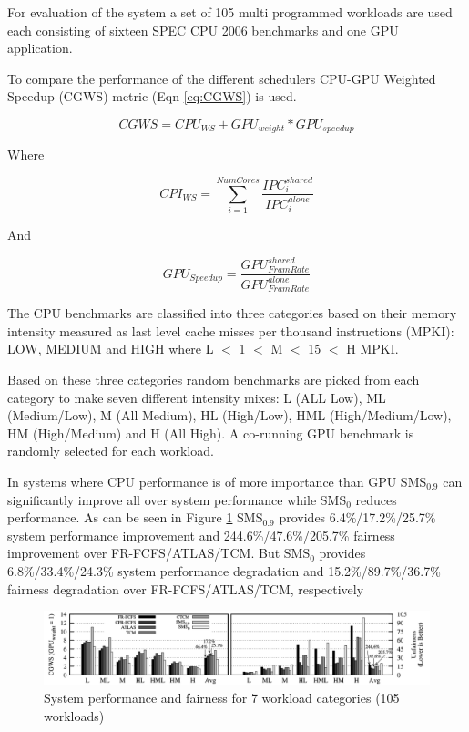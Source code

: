 \documentclass[12pt,journal,compsoc]{IEEEtran}
\begin{document}
For evaluation of the system a set of 105 multi programmed workloads are used each consisting of sixteen SPEC CPU 2006 benchmarks and one GPU application.  

To compare the performance of the different schedulers CPU-GPU Weighted Speedup (CGWS) metric (Eqn \ref{eq:CGWS})  is used.

\begin{equation}
CGWS = CPU_{WS} + GPU_{weight}*GPU_{speedup} \label{eq:CGWS}
\end{equation} 

Where
 
\begin{equation}
CPI_{WS} = \sum_{i=1}^{NumCores}\frac{IPC_i^{shared}}{IPC_i^{alone}}
\end{equation}

And 

\begin{equation}
GPU_{Speedup} = \frac{GPU_{FramRate}^{shared}}{GPU_{FramRate}^{alone}}
\end{equation}

The CPU benchmarks are classified into three categories based on their memory intensity measured as last level cache misses per thousand instructions (MPKI): LOW, MEDIUM and HIGH where L $<$ 1 $<$ M $<$ 15 $<$ H MPKI.

Based on these three categories random benchmarks are picked from each category to make seven different intensity mixes: L (ALL Low), ML (Medium/Low), M (All Medium), HL (High/Low),  HML (High/Medium/Low),  HM (High/Medium) and H (All High).  A co-running GPU benchmark is randomly selected for each workload.

In systems where CPU performance is of more importance than GPU SMS$_{0.9}$ can significantly improve all over system performance while SMS$_0$ reduces performance. As can be seen in Figure \ref{fig:SmS_GPU_1} SMS$_{0.9}$ provides 6.4\%/17.2\%/25.7\% system performance improvement and 244.6\%/47.6\%/205.7\% fairness improvement over FR-FCFS/ATLAS/TCM.
But SMS$_0$ provides 6.8\%/33.4\%/24.3\% system performance degradation and 15.2\%/89.7\%/36.7\% fairness degradation over FR-FCFS/ATLAS/TCM, respectively \cite{SmS}

\begin{figure}[H]
	\centering
	\includegraphics[width = 9.2 cm]{graphics/GPU_W_1.png}
	\caption{System performance and fairness for 7 workload categories (105 workloads) \cite{SmS}}\label{fig:SmS_GPU_1}
\end{figure}
\end{document}
